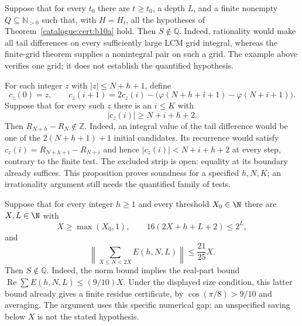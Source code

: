 \begin{thm}\label{catalogue:cert:b10b}
Suppose that for every $t_0$ there are $t\ge t_0$, a depth $L$, and a
finite nonempty $Q\subseteq\mathbb N_{>0}$ such that, with $H=H_t$,
all the hypotheses of Theorem~\ref{catalogue:cert:b10a} hold.
Then $S\notin\mathbb Q$. Indeed, rationality would make all tail
differences on every sufficiently large LCM grid integral, whereas the
finite-grid theorem supplies a nonintegral pair on such a grid.
The example above verifies one grid; it does not establish the
quantified hypothesis.
\end{thm}

\begin{prop}\label{catalogue:cert:b12}
For each integer $z$ with $|z|\le N+h+1$, define
\[
 c_z(0)=z,\qquad
 c_z(i+1)=2c_z(i)-\bigl(\varphi(N+h+i+1)-\varphi(N+i+1)\bigr).
\]
Suppose that for every such $z$ there is an $i\le K$ with
\[
 |c_z(i)|\ge N+i+h+2.
\]
Then $R_{N+h}-R_N\notin\mathbb Z$. Indeed, an integral value of the
tail difference would be one of the $2(N+h+1)+1$ initial candidates.
Its recurrence would satisfy $c_z(i)=R_{N+h+i}-R_{N+i}$ and hence
$|c_z(i)|<N+i+h+2$ at every step, contrary to the finite test.
The excluded strip is open: equality at its boundary already suffices.
This proposition proves soundness for a specified $h,N,K$; an
irrationality argument still needs the quantified family of tests.
\end{prop}

\begin{thm}\label{catalogue:mob:e1}
Suppose that for every integer $h\ge1$ and every threshold $X_0\in\N$
there are $X,L\in\N$ with
\[
 X\ge\max(X_0,1),\qquad 16(2X+h+L+2)\le2^L,
\]
and
\[
 \left\lVert\sum_{X\le N<2X}E(h,N,L)\right\rVert\le\frac{21}{25}X.
\]
Then $S\notin\mathbb Q$. Indeed, the norm bound implies the real-part
bound $\operatorname{Re}\sum E(h,N,L)\le(9/10)X$. Under the displayed
size condition, this latter bound already gives a finite residue
certificate, by $\cos(\pi/8)>9/10$ and averaging. The argument uses this
specific numerical gap; an unspecified saving below $X$ is not the
stated hypothesis.
\end{thm}

